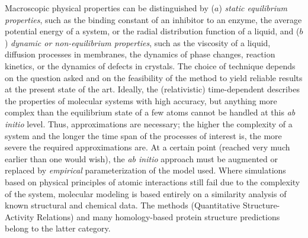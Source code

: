 Macroscopic physical properties can be distinguished by ($a$) {\em static 
equilibrium properties}, such as the binding constant  of an inhibitor to an 
enzyme, the average potential energy of a system, or the radial distribution  
function of a liquid, and ($b$) {\em
dynamic or non-equilibrium properties}, such as the viscosity of a 
liquid, diffusion processes in membranes, the dynamics of phase 
changes, reaction kinetics, or the dynamics of defects in crystals.  
The choice of technique depends on the question asked and on the 
feasibility of the method to yield reliable results at the present 
state of the art. Ideally, the (relativistic) time-dependent 
describes the properties of molecular systems 
with high accuracy, but anything more complex than the equilibrium 
state of a few atoms cannot be handled at this {\em ab initio} level. 
Thus, approximations are necessary; the higher the complexity of a 
system and the longer the time span of the processes of interest is, 
the more severe the required approximations are. At a certain point 
(reached very much earlier than one would wish), the {\em ab initio} 
approach must be augmented or replaced by {\em empirical} 
parameterization of the model used. Where simulations based on physical 
principles of atomic interactions still fail due to the complexity of the 
system, 
molecular modeling is based entirely on a similarity analysis of known 
structural and chemical data. The  methods (Quantitative 
Structure-Activity Relations) and many homology-based protein structure  
predictions belong to the latter category.

